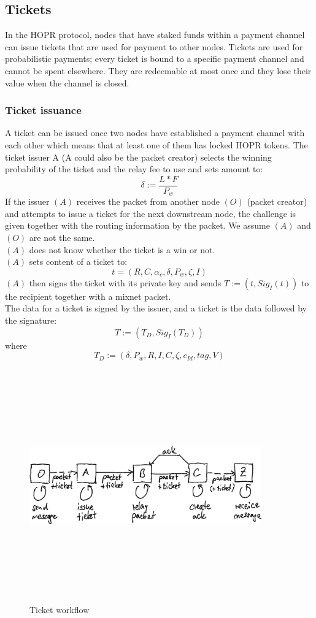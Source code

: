 \subsection{Tickets}
In the HOPR protocol, nodes that have staked funds within a payment channel can issue tickets that are used for payment to other nodes. 
Tickets are used for probabilistic payments; every ticket is bound to a specific payment channel and cannot be spent elsewhere. 
They are redeemable at most once and they lose their value when the channel is closed. 
\subsubsection{Ticket issuance}
A ticket can be issued once two nodes have established a payment channel with each other which means that at least one of them has locked HOPR tokens.
\newline The ticket issuer A (A could also be the packet creator) selects the winning probability of the ticket and the relay fee to use and sets amount to:
$$\delta:=\dfrac{L*F}{P_w}$$
If the issuer $(A)$ receives the packet from another node $(O)$ (packet creator) and attempts to issue a ticket for the next downstream node, 
the challenge is given together with the routing information by the packet. We assume $(A)$ and $(O)$ are not the same.
\\$(A)$ does not know whether the ticket is a win or not.
\\$(A)$ sets content of a ticket to: $$t=(R, C, \alpha_c, \delta, P_w, \zeta, I)$$ 
$(A)$ then signs the ticket with its private key and sends $T:= (t, Sig_I(t))$ to the recipient together with a mixnet packet.
\\The data for a ticket is signed by the issuer, and a ticket is the data followed by the signature: $$T:=(T_D,Sig_{I}(T_D))$$ where 
    $$T_D:=(\delta,P_w,R,I,C,\zeta,c_{Id},tag,V)$$
 \begin{figure}
    \centering
    \includegraphics[width=10cm,height=10cm,keepaspectratio]{../whitepaper/images/ticket_workflow.png}
    \caption{Ticket workflow}
    \label{fig:Ticket worklow}
\end{figure}


